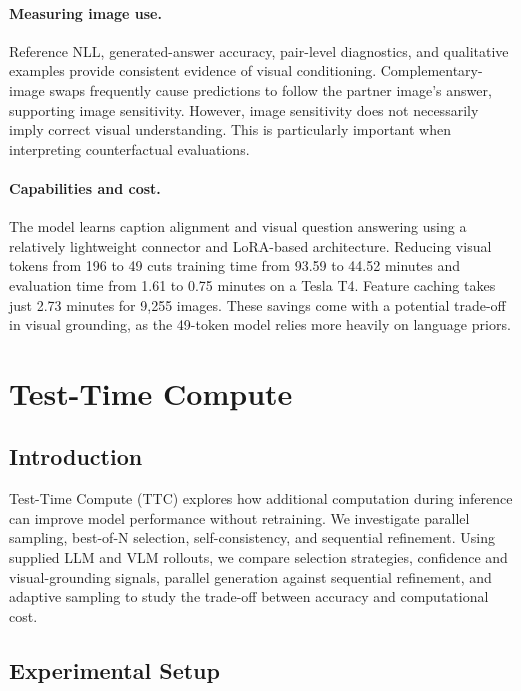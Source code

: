 \documentclass{article}
\begin{document}
\paragraph{Measuring image use.}
Reference NLL, generated-answer accuracy, pair-level diagnostics, and qualitative examples provide consistent evidence of visual conditioning. Complementary-image swaps frequently cause predictions to follow the partner image's answer, supporting image sensitivity. However, image sensitivity does not necessarily imply correct visual understanding. This is particularly important when interpreting counterfactual evaluations.

\paragraph{Capabilities and cost.}
The model learns caption alignment and visual question answering using a relatively lightweight connector and LoRA-based architecture. Reducing visual tokens from 196 to 49 cuts training time from 93.59 to 44.52 minutes and evaluation time from 1.61 to 0.75 minutes on a Tesla T4. Feature caching takes just 2.73 minutes for 9,255 images. These savings come with a potential trade-off in visual grounding, as the 49-token model relies more heavily on language priors.

\section{Test-Time Compute}
\label{sec:tts}

\subsection{Introduction}
\label{sec:tts-intro}

Test-Time Compute (TTC) explores how additional computation during inference can improve model performance without retraining. We investigate parallel sampling, best-of-N selection, self-consistency, and sequential refinement. Using supplied LLM and VLM rollouts, we compare selection strategies, confidence and visual-grounding signals, parallel generation against sequential refinement, and adaptive sampling to study the trade-off between accuracy and computational cost.

\subsection{Experimental Setup}
\label{sec:tts-setup}
\end{document}

